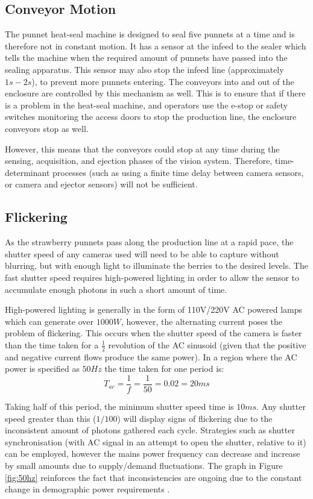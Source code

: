 \documentclass[fleqn,twoside,12pt]{report}
\begin{document}
\subsection{Conveyor Motion}

The punnet heat-seal machine is designed to seal five punnets at a time and is therefore not in constant motion. It has a sensor at the infeed to the sealer which tells the machine when the required amount of punnets have passed into the sealing apparatus. This sensor may also stop the infeed line (approximately $1s-2s$), to prevent more punnets entering. The conveyors into and out of the enclosure are controlled by this mechanism as well. This is to ensure that if there is a problem in the heat-seal machine, and operators use the e-stop or safety switches monitoring the access doors to stop the production line, the enclosure conveyors stop as well.

However, this means that the conveyors could stop at any time during the sensing, acquisition, and ejection phases of the vision system. Therefore, time-determinant processes (such as using a finite time delay between camera sensors, or camera and ejector sensors) will not be sufficient. 


\subsection{Flickering}

As the strawberry punnets pass along the production line at a rapid pace, the shutter speed of any cameras used will need to be able to capture without blurring, but with enough light to illuminate the berries to the desired levels. The fast shutter speed requires high-powered lighting in order to allow the sensor to accumulate enough photons in such a short amount of time.

High-powered lighting is generally in the form of 110V/220V AC powered lamps which can generate over $1000W$, however, the alternating current poses the problem of flickering. This occurs when the shutter speed of the camera is faster than the time taken for a $\frac{1}{2}$ revolution of the AC sinusoid (given that the positive and negative current flows produce the same power). In a region where the AC power is specified as $50Hz$ the time taken for one period is: 
\begin{equation}
T_{ac} = \frac{1}{f} = \frac{1}{50} = 0.02 = 20ms
\end{equation}

Taking half of this period, the minimum shutter speed time is $10ms$. Any shutter speed greater than this ($1/100$) will display signs of flickering due to the inconsistent amount of photons gathered each cycle. Strategies such as shutter synchronisation (with AC signal in an attempt to open the shutter, relative to it) can be employed, however the mains power frequency can decrease and increase by small amounts due to supply/demand fluctuations. The graph in Figure \ref{fig:50hz} reinforces the fact that inconsistencies are ongoing due to the constant change in demographic power requirements \cite{50hz}.
\end{document}
